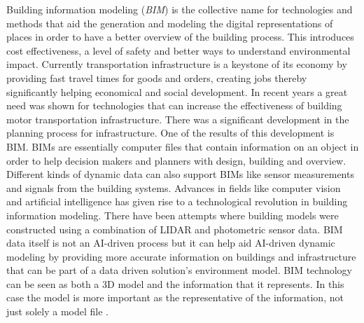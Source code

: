 \documentclass[
]{elteikthesis}[2023/04/10]
\begin{document}
Building information modeling (\emph{BIM}) is the collective name
for technologies and methods that aid the generation and modeling
the digital representations of places in order to have a better overview
of the building process. This introduces cost effectiveness, a level
of safety and better ways to understand environmental impact. Currently
transportation infrastructure is a keystone of its economy by providing
fast travel times for goods and orders, creating jobs thereby significantly
helping economical and social development. In recent years a great
need was shown for technologies that can increase the effectiveness
of building motor transportation infrastructure. There was a significant
development in the planning process for infrastructure. One of the
results of this development is BIM. BIMs are essentially computer
files that contain information on an object in order to help decision
makers and planners with design, building and overview. Different
kinds of dynamic data can also support BIMs like sensor measurements
and signals from the building systems. Advances in fields like computer
vision and artificial intelligence has given rise to a technological
revolution in building information modeling. There have been attempts
where building models were constructed using a combination of LIDAR
and photometric sensor data. BIM data itself is not an AI-driven process
but it can help aid AI-driven dynamic modeling by providing more accurate
information on buildings and infrastructure that can be part of a
data driven solution's environment model. BIM technology can be seen as both
a 3D model and the information that it represents. In this case the
model is more important as the representative of the information,
not just solely a model file \cite{kangari1990automation}.
\end{document}
